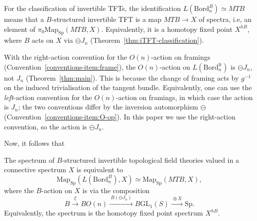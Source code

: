 \documentclass{amsart}
\begin{document}
\begin{remark}
\label{rmk:MTB-convention}
For the classification of invertible TFTs, the identification $L(\mathrm{Bord}_n^B) \simeq MTB$ means that a $B$-structured invertible TFT is a map $MTB \to X$ of spectra, i.e, an element of $\pi_0 \mathrm{Map}_{\mathrm{Sp}}(MTB, X)$. Equivalently, it is a homotopy fixed point $X^{hB}$, where $B$ acts on $X$ via $\ominus J_n$ (Theorem~\ref{thm:iTFT-classification}).
\end{remark}
\begin{remark}
\label{rmk:J-vs-ominusJ}
With the right-action convention for the $O(n)$-action on framings (Convention~\ref{conventions-item:frame}), the $O(n)$-action on $L(\mathrm{Bord}_n^{\mathrm{fr}})$ is $\ominus J_n$, not $J_n$ (Theorem~\ref{thm:main}). This is because the change of framing acts by $g^{-1}$ on the induced trivialisation of the tangent bundle. Equivalently, one can use the \emph{left}-action convention for the $O(n)$-action on framings, in which case the action is $J_n$; the two conventions differ by the inversion automorphism $\ominus$ (Convention~\ref{conventions-item:O-op}). In this paper we use the right-action convention, so the action is $\ominus J_n$.
\end{remark}
Now, it follows that 

\begin{theorem}
\label{thm:iTFT-classification}
The spectrum of $B$-structured invertible topological field theories valued in a connective spectrum $X$ is equivalent to
\[
\mathrm{Map}_{\mathrm{Sp}}(L(\mathrm{Bord}_n^B), X) \simeq \mathrm{Map}_{\mathrm{Sp}}(MTB, X),
\]
where the $B$-action on $X$ is via the composition
\[
B \xrightarrow{\ \xi\ } BO(n) \xrightarrow{\ B(\ominus J_n)\ } B\mathrm{GL}_1(S) \xrightarrow{\ \otimes X\ } \mathrm{Sp}.
\]
Equivalently, the spectrum is the homotopy fixed point spectrum $X^{hB}$.
\end{theorem}
\end{document}
